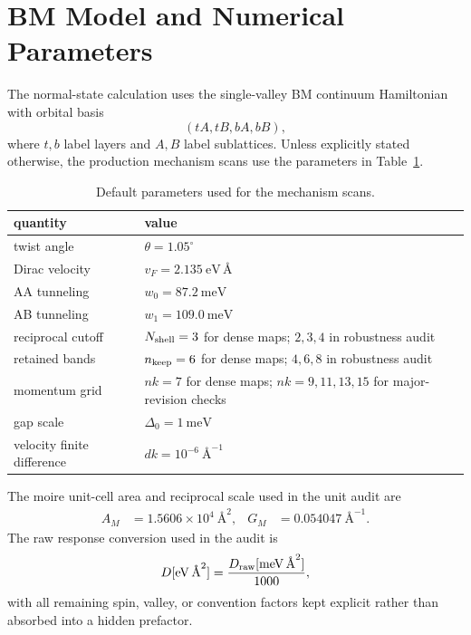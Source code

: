 \documentclass[aps,prb,preprint,superscriptaddress,floatfix,nofootinbib]{revtex4-2}
\begin{document}
\section{BM Model and Numerical Parameters}

The normal-state calculation uses the single-valley BM continuum Hamiltonian
with orbital basis
\begin{equation}
  (tA,tB,bA,bB),
\end{equation}
where $t,b$ label layers and $A,B$ label sublattices.  Unless explicitly stated
otherwise, the production mechanism scans use the parameters in
Table~\ref{tab:sm_parameters}.

\begin{table}[t]
\caption{Default parameters used for the mechanism scans.}
\label{tab:sm_parameters}
\begin{ruledtabular}
\begin{tabular}{ll}
quantity & value\\
\hline
twist angle & $\theta=1.05^\circ$\\
Dirac velocity & $v_F=2.135~\mathrm{eV}\,\text{\AA}$\\
AA tunneling & $w_0=87.2~\mathrm{meV}$\\
AB tunneling & $w_1=109.0~\mathrm{meV}$\\
reciprocal cutoff & $N_{\rm shell}=3$ for dense maps; $2,3,4$ in robustness audit\\
retained bands & $n_{\rm keep}=6$ for dense maps; $4,6,8$ in robustness audit\\
momentum grid & $nk=7$ for dense maps; $nk=9,11,13,15$ for major-revision checks\\
gap scale & $\Delta_0=1~\mathrm{meV}$\\
velocity finite difference & $dk=10^{-6}~\text{\AA}^{-1}$\\
\end{tabular}
\end{ruledtabular}
\end{table}

The moire unit-cell area and reciprocal scale used in the unit audit are
\begin{align}
  A_M &= 1.5606\times 10^4~\text{\AA}^{2}, &
  G_M &= 0.054047~\text{\AA}^{-1}.
\end{align}
The raw response conversion used in the audit is
\begin{equation}
  D[\mathrm{eV}\,\text{\AA}^{2}]
  =
  \frac{D_{\rm raw}[\mathrm{meV}\,\text{\AA}^{2}]}{1000},
\end{equation}
with all remaining spin, valley, or convention factors kept explicit rather
than absorbed into a hidden prefactor.
\end{document}

